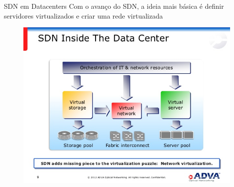 \documentclass[aspectratio=169]{beamer}
\begin{document}
		\begin{frame} {SDN em Datacenters}
			Com o avanço do SDN, a ideia mais básica é definir servidores virtualizados e criar uma rede virtualizada
			\begin{figure}[ht]   
				\includegraphics[scale=0.35]{imagens/inside-sdn.jpg}
				\label{fig:sample_figure}
			\end{figure}
		\end{frame}
\end{document}
